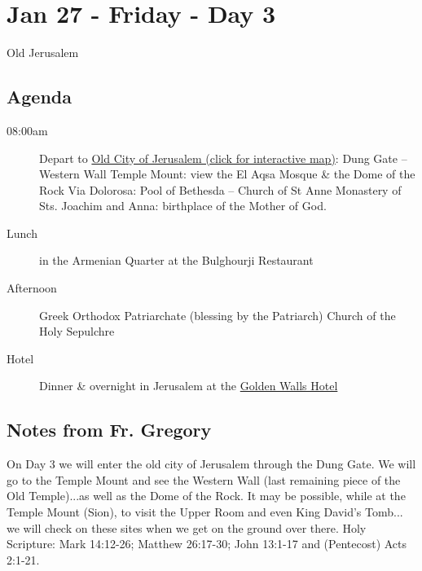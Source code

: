 \documentclass[letterpaper]{report}
\begin{document}

\clearpage

\clearpage
\section{Jan 27 - Friday - Day 3}
Old Jerusalem
\subsection{Agenda}
\begin{description}
	\item[08:00am] Depart to  \href{http://jerusalem.com/map#!/explore/view}{
			Old City of Jerusalem (click for interactive map)}:
		\subitem Dung Gate – Western Wall
		\subitem Temple Mount:
		    view the El Aqsa Mosque \& the Dome of the Rock 
		\subitem Via Dolorosa:
		    Pool of Bethesda -- Church of St Anne
		\subitem Monastery of Sts. Joachim and Anna:
		    birthplace of the Mother of God.
	\item[Lunch] in the Armenian Quarter at the Bulghourji Restaurant 
	\item[Afternoon] Greek Orthodox Patriarchate (blessing by the Patriarch) 
		\subitem Church of the Holy Sepulchre
	\item[Hotel] Dinner \& overnight in Jerusalem at the
	  \href{http://goldenwalls.com/}{Golden Walls Hotel}
\end{description}

\subsection{Notes from Fr. Gregory}
On Day 3 we will enter the old city of Jerusalem through the Dung Gate.
We will go to the Temple Mount and see the Western Wall
(last remaining piece of the Old Temple)...as well as the Dome of the Rock.
It may be possible, while at the Temple Mount (Sion),
to visit the Upper Room and even King David's Tomb...
we will check on these sites when we get on the ground over there.
Holy Scripture: Mark 14:12-26; Matthew 26:17-30;
John 13:1-17 and (Pentecost) Acts 2:1-21.
\end{document}

